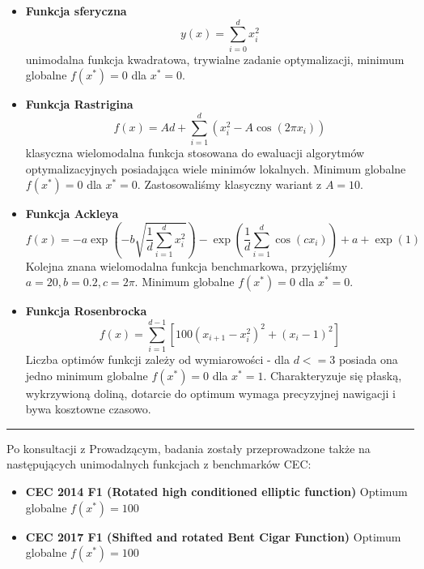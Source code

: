 \documentclass[12pt]{article}
\begin{document}
\begin{itemize}
	\item \textbf{Funkcja sferyczna}  \[y(x) = \sum_{i = 0}^{d} x_i^2 \] unimodalna funkcja kwadratowa, trywialne
	      zadanie optymalizacji, minimum globalne $f(x^*) = 0$ dla $x^*=0$.

	\item \textbf{Funkcja Rastrigina} \[f(x) = A d + \sum_{i=1}^{d} \left( x_i^2 - A \cos(2\pi x_i) \right)\]
	      klasyczna wielomodalna
	      funkcja stosowana do ewaluacji algorytmów optymalizacyjnych posiadająca wiele minimów lokalnych.
	      Minimum globalne $f(x^*) = 0$ dla $x^*=0$.
	      Zastosowaliśmy klasyczny wariant z \(A = 10\).

	\item \textbf{Funkcja Ackleya} \[f(x) = -a \exp \left( -b \sqrt{\frac{1}{d} \sum_{i=1}^{d} x_i^2} \right)
		      - \exp \left( \frac{1}{d} \sum_{i=1}^{d} \cos(c x_i) \right) + a + \exp(1)\]
	      Kolejna znana wielomodalna funkcja benchmarkowa, przyjęliśmy \(a = 20, b = 0.2, c = 2\pi\). Minimum globalne
	      $f(x^*) = 0$ dla $x^*=0$.

	\item \textbf{Funkcja Rosenbrocka} \[f(x) = \sum_{i=1}^{d-1} \left[ 100 (x_{i+1} - x_i^2)^2 + (x_i - 1)^2 \right]\]
	      Liczba optimów funkcji zależy od wymiarowości - dla \(d <= 3\) posiada ona jedno minimum globalne $f(x^*) = 0$ dla $x^* = 1$.
	      Charakteryzuje się płaską, wykrzywioną doliną, dotarcie do optimum wymaga precyzyjnej nawigacji i bywa kosztowne czasowo.
\end{itemize}

\begin{center}
	\rule{0.8\linewidth}{0.4pt}
\end{center}

Po konsultacji z Prowadzącym, badania zostały przeprowadzone także na następujących unimodalnych funkcjach z benchmarków CEC:

\begin{itemize}

	\item \textbf{CEC 2014 F1 (Rotated high conditioned elliptic function)}
	      Optimum globalne $f(x^*) = 100$

	\item \textbf{CEC 2017 F1 (Shifted and rotated Bent Cigar Function)}
	      Optimum globalne $f(x^*) = 100$

\end{itemize}
\end{document}
